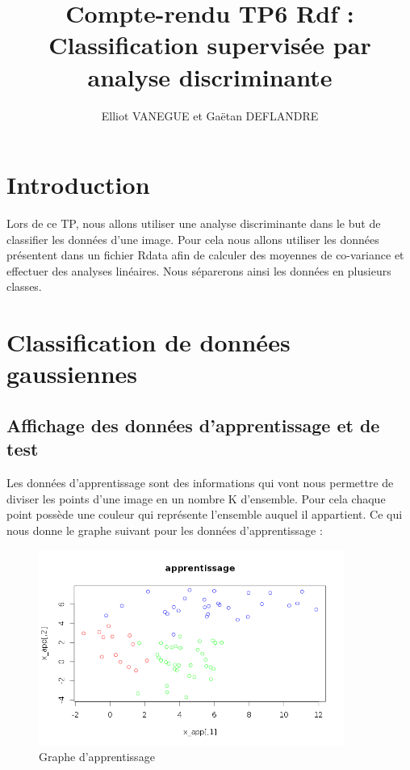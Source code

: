 \documentclass[a4paper,11pt]{article}
\title{Compte-rendu TP6 Rdf : Classification supervisée par analyse discriminante}
\author{Elliot VANEGUE et Gaëtan DEFLANDRE}
\begin{document}


  \maketitle
  
  \mbox{}
  \newpage
  \clearpage
  
  \section*{Introduction}
  Lors de ce TP, nous allons utiliser une analyse discriminante dans le but de classifier les données
  d'une image. Pour cela nous allons utiliser les données présentent dans un fichier Rdata afin 
  de calculer des moyennes de co-variance et effectuer des analyses linéaires. Nous séparerons
  ainsi les données en plusieurs classes.

  \section{Classification de données gaussiennes}
  \subsection{Affichage des données d'apprentissage et de test}
  Les données d'apprentissage sont des informations qui vont nous permettre de diviser les points d'une
  image en un nombre K d'ensemble. Pour cela chaque point possède une couleur qui représente l'ensemble
  auquel il appartient.
  Ce qui nous donne le graphe suivant pour les données d'apprentissage : 
  
  \begin{figure}[h]
   \center
   \includegraphics[width=10cm]{ensemble_apprentissage.png}
   \caption{Graphe d'apprentissage}
  \end{figure}
\end{document}
